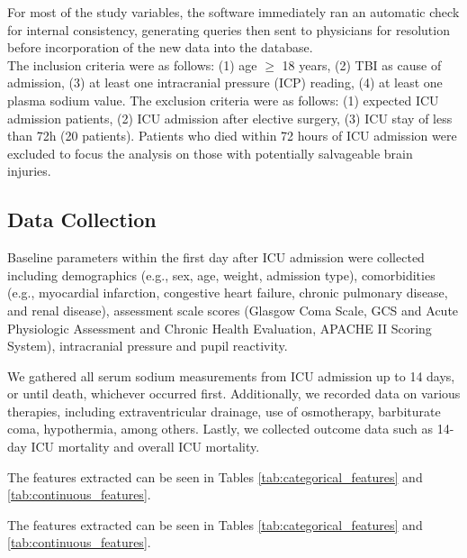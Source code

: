 For most of the study variables, the software immediately ran an automatic check for internal consistency, generating queries then sent to physicians for resolution before incorporation of the new data into the database.\\

The inclusion criteria were as follows: (1) age $\geq$ 18 years, (2) TBI as cause of admission, (3) at least one intracranial pressure (ICP) reading, (4) at least one plasma sodium value.
The exclusion criteria were as follows: (1) expected ICU admission patients, (2) ICU admission after elective surgery, (3) ICU stay of less than 72h (20 patients). Patients who died within 72 hours of ICU admission were excluded to focus the analysis on those with potentially salvageable brain injuries.

\subsection{Data Collection}
Baseline parameters within the first day after ICU admission were collected including demographics (e.g., sex, age, weight, admission type), comorbidities (e.g., myocardial infarction, congestive heart failure, chronic pulmonary disease, and renal disease), assessment scale scores (Glasgow Coma Scale, GCS and Acute Physiologic Assessment and Chronic Health Evaluation, APACHE II Scoring System), intracranial pressure and pupil reactivity.

We gathered all serum sodium measurements from ICU admission up to 14 days, or until death, whichever occurred first. Additionally, we recorded data on various therapies, including extraventricular drainage, use of osmotherapy, barbiturate coma, hypothermia, among others. Lastly, we collected outcome data such as 14-day ICU mortality and overall ICU mortality.

The features extracted can be seen in Tables \ref{tab:categorical_features} and \ref{tab:continuous_features}.

The features extracted can be seen in Tables \ref{tab:categorical_features} and \ref{tab:continuous_features}.

